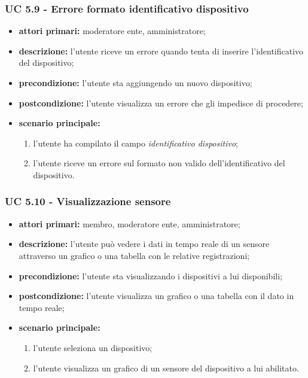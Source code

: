 			\subsubsection{UC 5.9 - Errore formato identificativo dispositivo}
			\begin{itemize}
				\item \textbf{attori primari:} moderatore ente, amministratore;
				\item \textbf{descrizione:} l'utente riceve un errore quando tenta di inserire l'identificativo del dispositivo;
				\item \textbf{precondizione:} l'utente sta aggiungendo un nuovo dispositivo;
				\item \textbf{postcondizione:} l'utente visualizza un errore che gli impedisce di procedere;
				\item \textbf{scenario principale:}
				\begin{enumerate}
					\item{l'utente ha compilato il campo \textit{identificativo dispositivo};}
					\item{l'utente riceve un errore sul formato non valido dell'identificativo del dispositivo.}
				\end{enumerate}
			\end{itemize}

			\subsubsection{UC 5.10 - Visualizzazione sensore}
			\begin{itemize}
				\item \textbf{attori primari:} membro, moderatore ente, amministratore;
				\item \textbf{descrizione:} l'utente può vedere i dati in tempo reale di un sensore attraverso un grafico o una tabella con le relative registrazioni;
				\item \textbf{precondizione:} l'utente sta visualizzando i dispositivi a lui disponibili;
				\item \textbf{postcondizione:} l'utente visualizza un grafico o una tabella con il dato in tempo reale;
				\item \textbf{scenario principale:}
				\begin{enumerate}
					\item{l'utente seleziona un dispositivo;}
					\item{l'utente visualizza un grafico di un sensore del dispositivo a lui abilitato.}
				\end{enumerate}
			\end{itemize}
